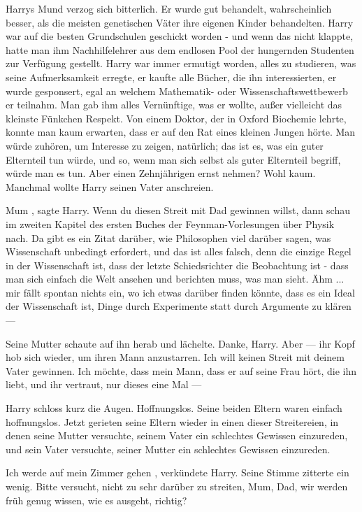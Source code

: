 Harrys Mund verzog sich bitterlich. Er wurde gut behandelt, wahrscheinlich
besser, als die meisten genetischen Väter ihre eigenen Kinder behandelten. Harry
war auf die besten Grundschulen geschickt worden - und wenn das nicht klappte,
hatte man ihm Nachhilfelehrer aus dem endlosen Pool der hungernden Studenten zur
Verfügung gestellt. Harry war immer ermutigt worden, alles zu studieren, was
seine Aufmerksamkeit erregte, er kaufte alle Bücher, die ihn interessierten, er
wurde gesponsert, egal an welchem Mathematik- oder Wissenschaftswettbewerb er
teilnahm. Man gab ihm alles Vernünftige, was er wollte, außer vielleicht das
kleinste Fünkchen Respekt. Von einem Doktor, der in Oxford Biochemie lehrte,
konnte man kaum erwarten, dass er auf den Rat eines kleinen Jungen hörte. Man
würde zuhören, um Interesse zu zeigen, natürlich; das ist es, was ein guter
Elternteil tun würde, und so, wenn man sich selbst als guter Elternteil begriff,
würde man es tun. Aber einen Zehnjährigen ernst nehmen? Wohl kaum. Manchmal
wollte Harry seinen Vater anschreien.

\glqq Mum\grqq{} , sagte Harry. \glqq Wenn du diesen Streit mit Dad gewinnen willst, dann schau
im zweiten Kapitel des ersten Buches der Feynman-Vorlesungen über Physik nach.
Da gibt es ein Zitat darüber, wie Philosophen viel darüber sagen, was
Wissenschaft unbedingt erfordert, und das ist alles falsch, denn die einzige
Regel in der Wissenschaft ist, dass der letzte Schiedsrichter die Beobachtung
ist - dass man sich einfach die Welt ansehen und berichten muss, was man sieht.
Ähm ... mir fällt spontan nichts ein, wo ich etwas darüber finden könnte, dass
es ein Ideal der Wissenschaft ist, Dinge durch Experimente statt durch Argumente
zu klären ---\grqq{}

Seine Mutter schaute auf ihn herab und lächelte. \glqq Danke, Harry. Aber ---\grqq{}
ihr Kopf hob sich wieder, um ihren Mann anzustarren. \glqq Ich will keinen Streit mit
deinem Vater gewinnen. Ich möchte, dass mein Mann, dass er auf seine Frau hört,
die ihn liebt, und ihr vertraut, nur dieses eine Mal ---\grqq{}

Harry schloss kurz die Augen. Hoffnungslos. Seine beiden Eltern waren einfach
hoffnungslos. Jetzt gerieten seine Eltern wieder in einen dieser Streitereien,
in denen seine Mutter versuchte, seinem Vater ein schlechtes Gewissen
einzureden, und sein Vater versuchte, seiner Mutter ein schlechtes Gewissen
einzureden.

\glqq Ich werde auf mein Zimmer gehen\grqq{} , verkündete Harry. Seine Stimme zitterte ein
wenig. \glqq Bitte versucht, nicht zu sehr darüber zu streiten, Mum, Dad, wir werden
früh genug wissen, wie es ausgeht, richtig?\grqq{}

